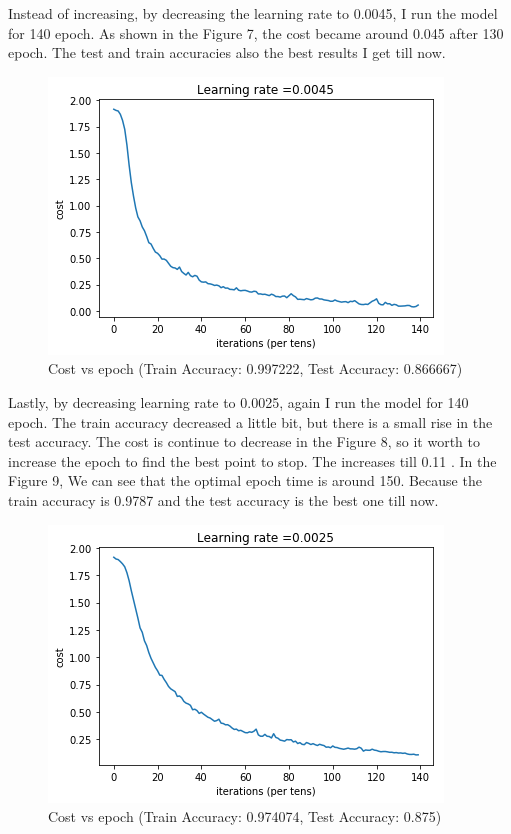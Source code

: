 \documentclass{article}
\begin{document}
Instead of increasing, by decreasing the learning rate to 0.0045, I run the model for 140 epoch. As shown in the Figure 7, the cost became around 0.045 after 130 epoch. The test and train accuracies also the best results I get till now.

\begin{figure}[h!]
	\centering
	\includegraphics[scale=0.55]{result0045ep140.png}
	\caption{Cost vs epoch (Train Accuracy: 0.997222,  Test Accuracy: 0.866667)}
	\label{fig:univerise}
\end{figure}

Lastly, by decreasing learning rate to 0.0025, again I run the model for 140 epoch. The train accuracy decreased a little bit, but there is a small rise in the test accuracy. The cost is continue to decrease in the Figure 8, so it worth to increase the epoch to find the best point to stop. The increases till 0.11 . In the Figure 9, We can see that the optimal epoch time is around 150. Because the train accuracy is 0.9787 and the test accuracy is the best one till now.

\begin{figure}[h!]
	\centering
	\includegraphics[scale=0.55]{result0025ep140.png}
	\caption{Cost vs epoch (Train Accuracy: 0.974074,  Test Accuracy: 0.875)}
	\label{fig:univerise}
\end{figure}
\end{document}
